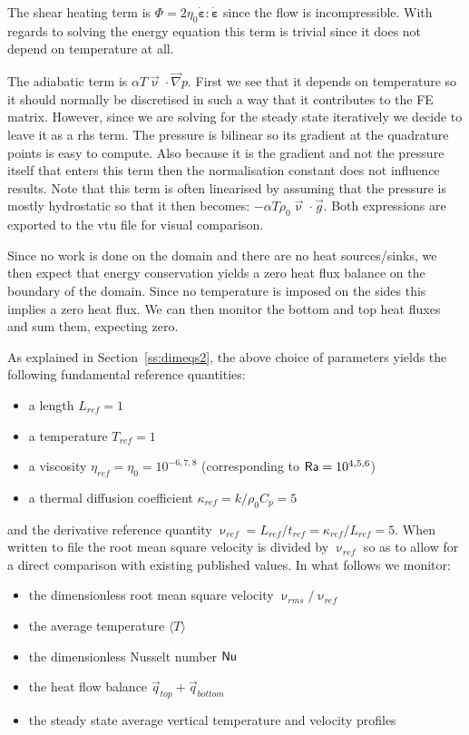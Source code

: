 The shear heating term is $\Phi=2 \eta_0 \dot{\bm \varepsilon}:\dot{\bm \varepsilon}$ since the flow
is incompressible. With regards to solving the energy equation this term is trivial since it does not
depend on temperature at all.

The adiabatic term is $\alpha T \vec{\upnu}\cdot\vec\nabla p$. 
First we see that it depends on temperature so it should normally be discretised in such a 
way that it contributes to the FE matrix. However, since we are solving for the steady state
iteratively we decide to leave it as a rhs term.
The pressure is bilinear so its gradient at the quadrature points is easy to compute.  
Also because it is the gradient and not the pressure itself that enters this term then 
the normalisation constant does not influence results.
Note that this term is often linearised by assuming that the pressure is mostly hydrostatic
so that it then becomes: $- \alpha T \rho_0 \vec\upnu\cdot\vec{g}$.
Both expressions are exported to the vtu file for visual comparison.

Since no work is done on the domain and there are no heat sources/sinks, we then 
expect that energy conservation yields a zero heat flux balance on the boundary of the domain. 
Since no temperature is imposed on the sides this implies a zero heat flux. 
We can then monitor the bottom and top heat fluxes and sum them, expecting zero.  


As explained in Section~\ref{ss:dimeqs2}, the above choice of parameters yields the following 
fundamental reference quantities:
\begin{itemize}
\item a length $L_{ref}=1$ 
\item a temperature $T_{ref}=1$ 
\item a viscosity $\eta_{ref}=\eta_0=10^{-6,7,8}$ (corresponding to ${\mathsf{Ra}}=10^{4,5,6}$) 
\item a thermal diffusion coefficient $\kappa_{ref}=k/\rho_0 C_p = 5$ 
\end{itemize}
and the derivative reference quantity $\upnu_{ref} = L_{ref} / t_{ref} = \kappa_{ref}/L_{ref} = 5$.
When written to file the root mean square velocity is divided by $\upnu_{ref}$ so as to allow
for a direct comparison with existing published values.
In what follows we monitor:
\begin{itemize}
\item the dimensionless root mean square velocity $\upnu_{rms}/\upnu_{ref}$
\item the average temperature $\langle T \rangle$
\item the dimensionless Nusselt number ${\mathsf{Nu}}$
\item the heat flow balance $\vec{q}_{top}+\vec{q}_{bottom}$
\item the steady state average vertical temperature and velocity profiles
\end{itemize}

